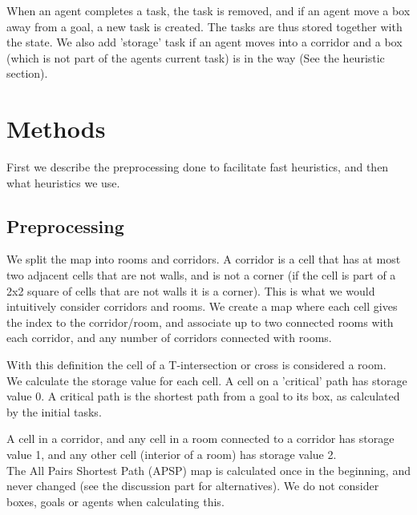 \documentclass[letterpaper]{article}
\begin{document}
When an agent completes a task, the task is removed, and if an agent move a box away from
a goal, a new task is created. The tasks are thus stored together with the state.
We also add 'storage' task if an agent moves into a corridor and a box (which is not
part of the agents current task) is in the way (See the heuristic section).

\section{Methods}
First we describe the preprocessing done to facilitate fast heuristics, and then
what heuristics we use.

\subsection{Preprocessing}
We split the map into rooms and corridors. A corridor is a cell that has at most
two adjacent cells that are not walls, and is not a corner (if the cell is part of
a 2x2 square of cells that are not walls it is a corner). This is what we would
intuitively consider corridors and rooms. We create a map where each cell gives
the index to the corridor/room, and associate up to two connected rooms with each corridor,
and any number of corridors connected with rooms.

With this definition the cell of a T-intersection or cross is considered a room.\\

We calculate the storage value for each cell. A cell on a 'critical' path has storage
value 0. A critical path is the shortest path from a goal to its box, as calculated
by the initial tasks.

A cell in a corridor, and any cell in a room connected to a corridor has storage
value 1, and any other cell (interior of a room) has storage value 2.\\

The All Pairs Shortest Path (APSP) map is calculated once in the beginning, and never changed (see the discussion
part for alternatives). We do not consider boxes, goals or agents when calculating
this.
\end{document}
